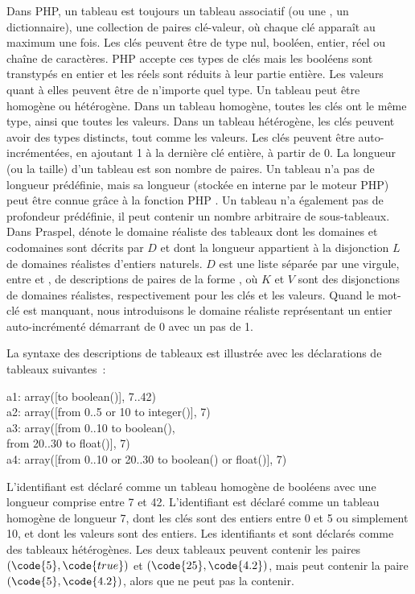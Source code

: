Dans PHP, un tableau est toujours un {\strong tableau associatif} (ou une
, un dictionnaire), \ie une collection de paires clé-valeur, où
chaque clé apparaît au maximum une fois. Les clés peuvent être de type nul,
booléen, entier, réel ou chaîne de caractères. PHP accepte ces types de clés
mais les booléens sont transtypés en entier et les réels sont réduits à leur
partie entière. Les valeurs quant à elles peuvent être de n'importe quel type.
Un tableau peut être {\strong homogène} ou {\strong hétérogène}. Dans un tableau
homogène, toutes les clés ont le même type, ainsi que toutes les valeurs. Dans
un tableau hétérogène, les clés peuvent avoir des types distincts, tout comme
les valeurs. Les clés peuvent être auto-incrémentées, en ajoutant 1 à la
dernière clé entière, à partir de 0. La longueur (ou la taille) d'un tableau est
son nombre de paires. Un tableau n'a pas de longueur prédéfinie, mais sa
longueur (stockée en interne par le moteur PHP) peut être connue grâce à la
fonction PHP . Un tableau n'a également pas de profondeur
prédéfinie, \ie il peut contenir un nombre arbitraire de sous-tableaux. \\

Dans Praspel,  dénote le domaine réaliste des tableaux
dont les domaines et codomaines sont décrits par $D$ et dont la longueur
appartient à la disjonction $L$ de domaines réalistes d'entiers naturels.  $D$
est une liste séparée par une virgule, entre \code{[} et \code{]}, de {\strong
descriptions} de paires de la forme , où $K$ et $V$ sont
des disjonctions de domaines réalistes, respectivement pour les clés et les
valeurs. Quand le mot-clé  est manquant, nous introduisons le domaine
réaliste représentant un entier auto-incrémenté démarrant de 0 avec un pas de 1.

\begin{example}

La syntaxe des descriptions de tableaux est illustrée avec les déclarations de
tableaux suivantes~:
%
\begin{pre}
a1: array([to boolean()], 7..42) \\
a2: array([from 0..5 or 10 to integer()], 7) \\
a3: array([from 0..10 to boolean(), \\
           from 20..30 to float()], 7) \\
a4: array([from 0..10 or 20..30 to boolean() or float()], 7)
\end{pre}
%
L'identifiant  est déclaré comme un tableau homogène de booléens avec
une longueur comprise entre 7 et 42. L'identifiant  est déclaré comme
un tableau homogène de longueur 7, dont les clés sont des entiers entre 0 et 5
ou simplement 10, et dont les valeurs sont des entiers. Les identifiants
 et  sont déclarés comme des tableaux hétérogènes. Les deux
tableaux peuvent contenir les paires $(\code{5}, \code{true})$ et $(\code{25},
\code{4.2})$, mais  peut contenir la paire $(\code{5}, \code{4.2})$,
alors que  ne peut pas la contenir.

\end{example}

